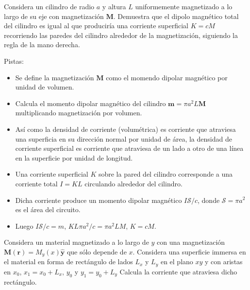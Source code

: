 \documentclass{exam}
\begin{document}
\begin{questions}


\question Considera un cilindro de radio $a$ y altura $L$
  uniformemente magnetizado a lo largo de su eje con magnetización
  $\bm M$. Demuestra que el dipolo magnético total del cilindro es
  igual al que produciría una corriente superficial $K=cM$ recorriendo
  las paredes del cilindro alrededor de la magnetización, siguiendo la
  regla de la mano derecha.

  Pistas:
  \begin{itemize}
  \item Se define la magnetización $\bm M$ como el momendo dipolar magnético
    por unidad de volumen.
  \item Calcula el momento dipolar magnético del cilindro $\bm m=\pi
    a^2 L \bm M$ multiplicando magnetización por volumen.
  \item Así como la densidad de corriente (volumétrica) es corriente
    que atraviesa una superficia en su dirección normal por unidad de
    área, la densidad de corriente superficial es corriente que
    atraviesa de un lado a otro de una línea en la superficie por
    unidad de longitud.
  \item Una corriente superficial $K$ sobre la pared del cilindro
    corresponde a una corriente total $I=KL$ circulando alrededor del
    cilindro.
  \item Dicha corriente produce un momento dipolar magnético
    $I\mathcal S/c$, donde $\mathcal S=\pi a^2$ es el área del
    circuito.
  \item Luego $I\mathcal S/c=m$, $KL\pi a^2/c=\pi a^2 LM$, $K=cM$.
  \end{itemize}


\question Considera un material magnetizado a lo largo de $y$ con una
  magnetización $\bm M(\bm r)=M_y(x)\hat{\bm y}$ que sólo depende de
  $x$. Considera una superficie immersa en el material en forma de
  rectángulo de lados $L_x$ y $L_y$ en el plano $xy$ y con aristas en
  $x_0$, $x_1=x_0+L_x$, $y_0$ y $y_1=y_0+L_y$ Calcula la
  corriente que atraviesa dicho rectángulo.


\end{questions}
\end{document}
